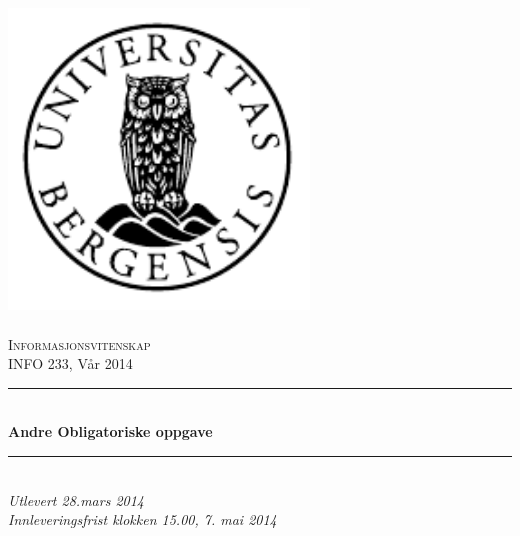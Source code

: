 \documentclass[norsk]{article}
\renewcommand{\maketitle}{}
\begin{document}
\maketitle

\newcommand{\blankpage}{\newpage{}\thispagestyle{empty}\mbox{}\newpage{}}
\newcommand{\HRule}{\rule{\linewidth}{0.5mm}}

\begin{titlepage}
\begin{center}
\includegraphics[width=8cm]{uib-emblem-svart} \\[0.5cm]
\paragraph*{}

\textsc{\Large Informasjonsvitenskap}\\[0.5cm]
\Large INFO 233, Vår 2014\\[0.4cm]
\HRule \\[0.4cm]
{ \huge \bfseries Andre Obligatoriske oppgave}\\[0.5cm]
\HRule \\[1.0cm]

{\large \emph{Utlevert 28.mars 2014}}\\
{\large \emph{Innleveringsfrist klokken 15.00, 7. mai 2014}}\\



\paragraph*{}
\end{center}
\vfill
\begin{center}
\end{center}
\end{titlepage}
\end{document}

